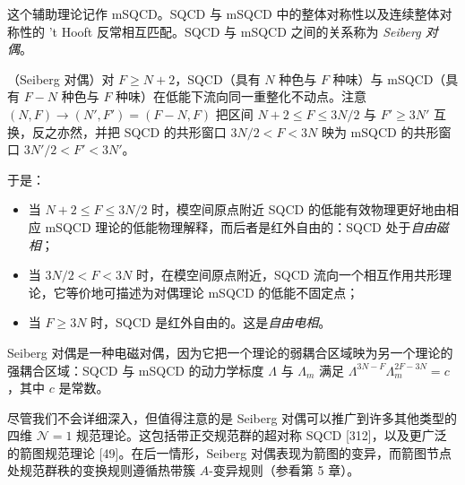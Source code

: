 这个辅助理论记作 mSQCD。SQCD 与 mSQCD 中的整体对称性以及连续整体对称性的 't Hooft 反常相互匹配。SQCD 与 mSQCD 之间的关系称为 \emph{Seiberg 对偶}。

\begin{proposition}[17.50]
（Seiberg 对偶）对 $F\ge N+2$，SQCD（具有 $N$ 种色与 $F$ 种味）与 mSQCD（具有 $F-N$ 种色与 $F$ 种味）在低能下流向同一重整化不动点。注意 $(N,F)\to(N',F')=(F-N,F)$ 把区间 $N+2\le F\le3N/2$ 与 $F'\ge3N'$ 互换，反之亦然，并把 SQCD 的共形窗口 $3N/2<F<3N$ 映为 mSQCD 的共形窗口 $3N'/2<F'<3N'$。
\end{proposition}

于是：
\begin{itemize}
\item 当 $N+2\le F\le3N/2$ 时，模空间原点附近 SQCD 的低能有效物理更好地由相应 mSQCD 理论的低能物理解释，而后者是红外自由的：SQCD 处于\emph{自由磁相}；
\item 当 $3N/2<F<3N$ 时，在模空间原点附近，SQCD 流向一个相互作用共形理论，它等价地可描述为对偶理论 mSQCD 的低能不固定点；
\item 当 $F\ge3N$ 时，SQCD 是红外自由的。这是\emph{自由电相}。
\end{itemize}

\begin{remark}[17.51]
Seiberg 对偶是一种电磁对偶，因为它把一个理论的弱耦合区域映为另一个理论的强耦合区域：SQCD 与 mSQCD 的动力学标度 $\Lambda$ 与 $\Lambda_m$ 满足 $\Lambda^{3N-F}\Lambda_m^{2F-3N}=c$，其中 $c$ 是常数。
\end{remark}


尽管我们不会详细深入，但值得注意的是 Seiberg 对偶可以推广到许多其他类型的四维 $\mathcal{N}=1$ 规范理论。这包括带正交规范群的超对称 SQCD [312]，以及更广泛的箭图规范理论 [49]。在后一情形，Seiberg 对偶表现为箭图的变异，而箭图节点处规范群秩的变换规则遵循热带簇 $A$-变异规则（参看第 5 章）。

